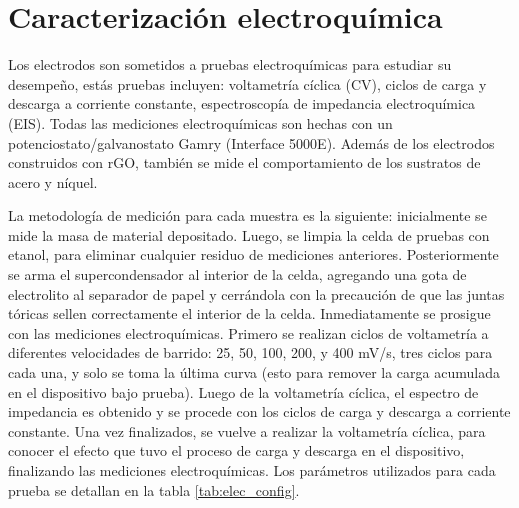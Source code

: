 \section{Caracterización electroquímica}
Los electrodos son sometidos a pruebas electroquímicas para estudiar su desempeño, estás pruebas incluyen: voltametría cíclica (CV), ciclos de carga y descarga a corriente constante, espectroscopía de impedancia electroquímica (EIS). Todas las mediciones electroquímicas son hechas con un potenciostato/galvanostato Gamry (Interface 5000E). Además de los electrodos construidos con rGO, también se mide el comportamiento de los sustratos de acero y níquel.

La metodología de medición para cada muestra es la siguiente: inicialmente se mide la masa de material depositado. Luego, se limpia la celda de pruebas con etanol, para eliminar cualquier residuo de mediciones anteriores. Posteriormente se arma el supercondensador al interior de la celda, agregando una gota de electrolito al separador de papel y cerrándola con la precaución de que las juntas tóricas sellen correctamente el interior de la celda. Inmediatamente se prosigue con las mediciones electroquímicas. Primero se realizan ciclos de voltametría a diferentes velocidades de barrido: 25, 50, 100, 200, y 400 mV/s, tres ciclos para cada una, y solo se toma la última curva (esto para remover la carga acumulada en el dispositivo bajo prueba).  Luego de la voltametría cíclica, el espectro de impedancia es obtenido y se procede con los ciclos de carga y descarga a corriente constante. Una vez finalizados, se vuelve a realizar la voltametría cíclica, para conocer el efecto que tuvo el proceso de carga y descarga en el dispositivo, finalizando las mediciones electroquímicas. Los parámetros utilizados para cada prueba se detallan en la tabla \ref{tab:elec_config}.


